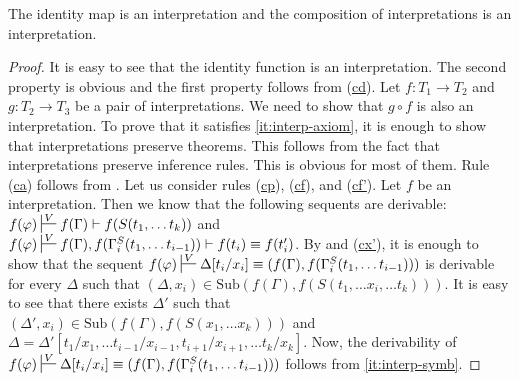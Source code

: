 \documentclass[reqno]{amsart}
\newcommand{\axref}[1]{(\hyperref[ax:#1]{#1})}
\theoremstyle{definition}
\theoremstyle{remark}
\newcommand{\fs}[1]{\mathrm{#1}}
\newcommand{\sub}{\fs{Sub}}
\numberwithin{figure}{section}
\begin{document}
\begin{lem}
The identity map is an interpretation and the composition of interpretations is an interpretation.
\end{lem}
\begin{proof}
It is easy to see that the identity function is an interpretation.
The second property is obvious and the first property follows from \axref{cd}.
Let $f : T_1 \to T_2$ and $g : T_2 \to T_3$ be a pair of interpretations.
We need to show that $g \circ f$ is also an interpretation.
To prove that it satisfies \eqref{it:interp-axiom}, it is enough to show that interpretations preserve theorems.
This follows from the fact that interpretations preserve inference rules.
This is obvious for most of them.
Rule \axref{ca} follows from .
Let us consider rules \axref{cp}, \axref{cf}, and \axref{cf'}.
Let $f$ be an interpretation.
Then we know that the following sequents are derivable: $f(\varphi) \sststile{}{V} f(\Gamma) \vdash f(S(t_1, \ldots t_k))$ and $f(\varphi) \sststile{}{V} f(\Gamma), f(\Gamma_i^S(t_1, \ldots t_{i-1})) \vdash f(t_i) \equiv f(t_i')$.
By  and \axref{cx'}, it is enough to show that the sequent $f(\varphi) \sststile{}{V} \Delta[t_i/x_i] \equiv (f(\Gamma),f(\Gamma_i^S(t_1, \ldots t_{i-1})))$ is derivable for every $\Delta$ such that $(\Delta,x_i) \in \sub(f(\Gamma), f(S(t_1, \ldots x_i, \ldots t_k)))$.
It is easy to see that there exists $\Delta'$ such that $(\Delta',x_i) \in \sub(f(\Gamma), f(S(x_1, \ldots x_k)))$ and $\Delta = \Delta'[t_1/x_1, \ldots t_{i-1}/x_{i-1}, t_{i+1}/x_{i+1}, \ldots t_k/x_k]$.
Now, the derivability of $f(\varphi) \sststile{}{V} \Delta[t_i/x_i] \equiv (f(\Gamma),f(\Gamma_i^S(t_1, \ldots t_{i-1})))$ follows from \eqref{it:interp-symb}.


\end{proof}
\end{document}

